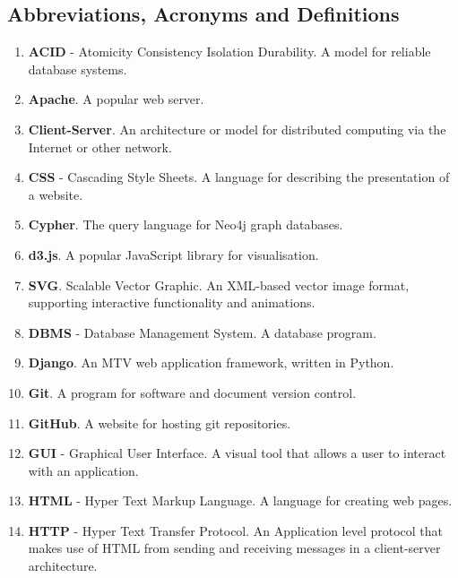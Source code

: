 \documentclass[12pt,onecolumn]{article}
\begin{document}
	\subsection{Abbreviations, Acronyms and Definitions} %
	
	\begin{enumerate}
		\item \textbf{ACID} - Atomicity Consistency Isolation Durability. A model for reliable database systems.
		
		\item \textbf{Apache}. A popular web server.
		
		\item \textbf{Client-Server}. An architecture or model for distributed computing via the Internet or other network.
		
		\item \textbf{CSS} - Cascading Style Sheets. A language for describing the presentation of a website.
		
		\item \textbf{Cypher}. The query language for Neo4j graph databases.
		
		\item \textbf{d3.js}. A popular JavaScript library for visualisation.
		
		\item \textbf{SVG}. Scalable Vector Graphic. An XML-based vector image format, supporting interactive functionality and animations.
		
		\item \textbf{DBMS} - Database Management System. A database program.
		
		\item \textbf{Django}. An MTV web application framework, written in Python.
		
		\item \textbf{Git}. A program for software and document version control.
		
		\item \textbf{GitHub}. A website for hosting git repositories.
		
		\item \textbf{GUI} - Graphical User Interface. A visual tool that allows a user to interact with an application.
		
		\item \textbf{HTML} - Hyper Text Markup Language. A language for creating web pages.
		
		\item \textbf{HTTP} - Hyper Text Transfer Protocol. An Application level protocol that makes use of HTML from sending and receiving messages in a client-server architecture.
		

\end{enumerate}
\end{document}
